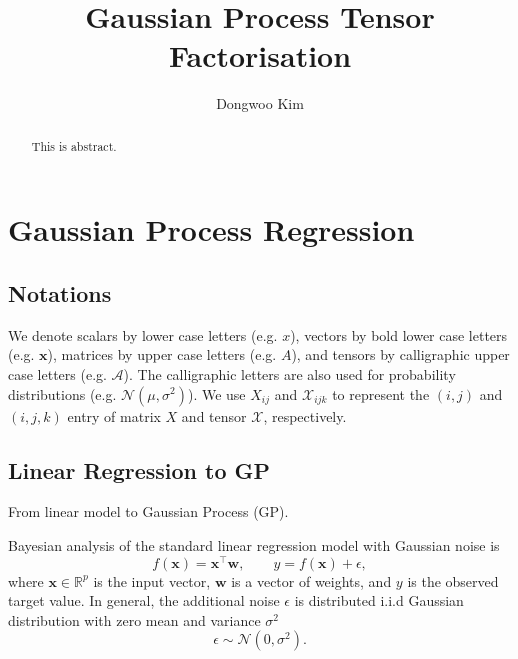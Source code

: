 \documentclass{article} %
\title{Gaussian Process Tensor Factorisation}
\author{
Dongwoo Kim
}
\theoremstyle{definition}
\newcommand\mb{\mathbf}
\newcommand\mc{\mathcal}
\begin{document}
\maketitle

\begin{abstract}
This is abstract.
\end{abstract}

\section{Gaussian Process Regression}

\subsection{Notations}
We denote scalars by lower case letters (e.g. $x$), vectors by bold lower case letters (e.g. $\mb x$), matrices by upper case letters (e.g. $A$), and tensors by calligraphic upper case letters (e.g. $\mc A$). The calligraphic letters are also used for probability distributions (e.g. $\mc{N}(\mu, \sigma^2)$).
We use $X_{ij}$ and $\mc{X}_{ijk}$ to represent the $(i,j)$ and $(i,j,k)$ entry of matrix $X$ and tensor $\mc{X}$, respectively.
\subsection{Linear Regression to GP}

From linear model to Gaussian Process (GP).

Bayesian analysis of the standard linear regression model with Gaussian noise is
\begin{equation}
f(\mb{x}) = \mb{x}^\top \mb{w}, \quad \quad y = f(\mb{x}) + \epsilon,
\end{equation}
where $\mb{x} \in \mathbb{R}^p$ is the input vector, $\mb{w}$ is a vector of weights, and $y$ is the observed target value. In general, the additional noise $\epsilon$ is distributed i.i.d Gaussian distribution with zero mean and variance $\sigma^2$
\begin{equation}
\epsilon \sim \mc{N}(0, \sigma^2).
\end{equation}
\end{document}
